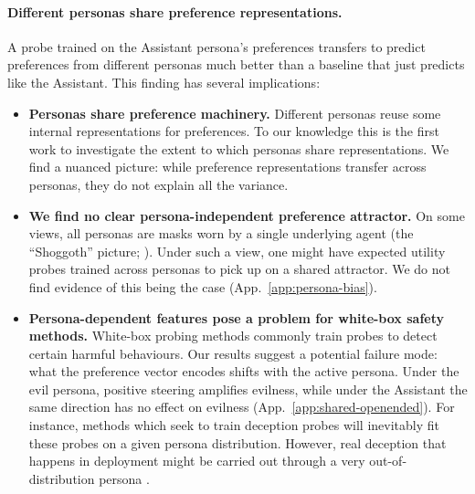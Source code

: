 \documentclass{article}
\begin{document}
\paragraph{Different personas share preference representations.}
A probe trained on the Assistant persona's preferences transfers to predict preferences from different personas much better than a baseline that just predicts like the Assistant. This finding has several implications:
\begin{itemize}
\item \textbf{Personas share preference machinery.} Different personas reuse some internal representations for preferences. To our knowledge this is the first work to investigate the extent to which personas share representations. We find a nuanced picture: while preference representations transfer across personas, they do not explain all the variance.
\item \textbf{We find no clear persona-independent preference attractor.} On some views, all personas are masks worn by a single underlying agent (the ``Shoggoth'' picture; \citealp{janus2022simulators, marks2026personaselection}). Under such a view, one might have expected utility probes trained across personas to pick up on a shared attractor. We do not find evidence of this being the case (App.~\ref{app:persona-bias}). 
\item \textbf{Persona-dependent features pose a problem for white-box safety methods.} White-box probing methods commonly train probes to detect certain harmful behaviours. Our results suggest a potential failure mode: what the preference vector encodes shifts with the active persona. Under the evil persona, positive steering amplifies evilness, while under the Assistant the same direction has no effect on evilness (App.~\ref{app:shared-openended}). For instance, methods which seek to train deception probes will inevitably fit these probes on a given persona distribution. However, real deception that happens in deployment might be carried out through a very out-of-distribution persona \citep{goldowskydill2025deception, haralambiev2026probesfanatics}.
\end{itemize}
\end{document}
